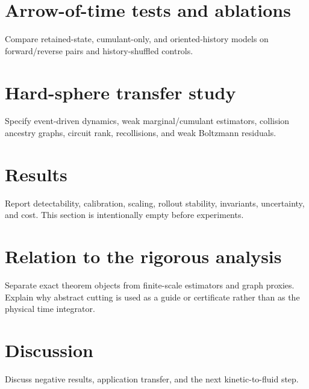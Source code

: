\documentclass[11pt]{article}
\begin{document}
\section{Arrow-of-time tests and ablations}
Compare retained-state, cumulant-only, and oriented-history models on
forward/reverse pairs and history-shuffled controls.

\section{Hard-sphere transfer study}
Specify event-driven dynamics, weak marginal/cumulant estimators, collision
ancestry graphs, circuit rank, recollisions, and weak Boltzmann residuals.

\section{Results}
Report detectability, calibration, scaling, rollout stability, invariants,
uncertainty, and cost. This section is intentionally empty before experiments.

\section{Relation to the rigorous analysis}
Separate exact theorem objects from finite-scale estimators and graph proxies.
Explain why abstract cutting is used as a guide or certificate rather than as
the physical time integrator.

\section{Discussion}
Discuss negative results, application transfer, and the next kinetic-to-fluid
step.
\end{document}
